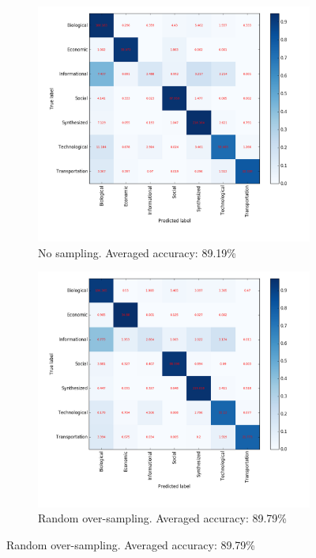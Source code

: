 \documentclass{article}
\begin{document}
\begin{figure}[H]
\begin{subfigure}{0.48\textwidth}
\includegraphics[width=\linewidth]{figs/similarity/Domain/None/confusion.png}
\caption{No sampling. Averaged accuracy: 89.19\%} \label{no_confusion}
\end{subfigure}\hspace*{\fill}
\begin{subfigure}{0.48\textwidth}
\includegraphics[width=\linewidth]{figs/similarity/Domain/RandomOver/confusion.png}
\caption{Random over-sampling. Averaged accuracy: 89.79\%} \label{random_over_confusion}
\end{subfigure}


\end{figure}
\end{document}

